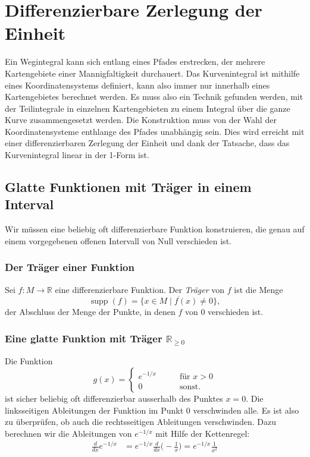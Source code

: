 %
%
\section{Differenzierbare Zerlegung der Einheit
\label{buch:kurvenintegral:section:zerlegung}}
Ein Wegintegral kann sich entlang eines Pfades erstrecken, der
mehrere Kartengebiete einer Mannigfaltigkeit durchauert.
Das Kurvenintegral ist mithilfe eines Koordinatensystems definiert,
kann also immer nur innerhalb eines Kartengebietes berechnet werden.
Es muss also ein Technik gefunden werden, mit der Teilintegrale in
einzelnen Kartengebieten zu einem Integral über die ganze Kurve
zusammengesetzt werden.
Die Konstruktion muss von der Wahl der Koordinatensysteme enthlange
des Pfades unabhängig sein.
Dies wird erreicht mit einer differenzierbaren Zerlegung der Einheit
und dank der Tatsache, dass das Kurvenintegral linear in der 1-Form
ist.

%
%
\subsection{Glatte Funktionen mit Träger in einem Interval}
Wir müssen eine beliebig oft differenzierbare Funktion konstruieren,
die genau auf einem vorgegebenen offenen Intervall von Null
verschieden ist.

%
%
\subsubsection{Der Träger einer Funktion}

\begin{definition}
Sei $f\colon M\to\mathbb{R}$ eine differenzierbare Funktion.
Der {\em Träger} von $f$ ist die Menge
%
\[
\operatorname{supp}(f)
=
\overline{
\{x\in M\mid f(x)\ne 0\}
},
\]
der Abschluss der Menge der Punkte, in denen $f$ von $0$ verschieden
ist.
\end{definition}

%
%
\subsubsection{Eine glatte Funktion mit Träger $\mathbb{R}_{\ge 0}$}
Die Funktion
\[
g(x)
=
\begin{cases}
e^{-1/x}&\qquad \text{für $x>0$}\\
0       &\qquad \text{sonst.}
\end{cases}
\]
ist sicher beliebig oft differenzierbar ausserhalb des Punktes $x=0$.
Die linksseitigen Ableitungen der Funktion im Punkt $0$ verschwinden
alle.
Es ist also zu überprüfen, ob auch die rechtsseitigen Ableitungen
verschwinden.
Dazu berechnen wir die Ableitungen von $e^{-1/x}$ mit Hilfe der
Kettenregel:
\begin{align*}
\frac{d}{dx}e^{-1/x}
&=
e^{-1/x}\frac{d}{dx}\biggl(-\frac1x\biggr)
=
e^{-1/x}\frac{1}{x^2}
\\
\end{align*}

